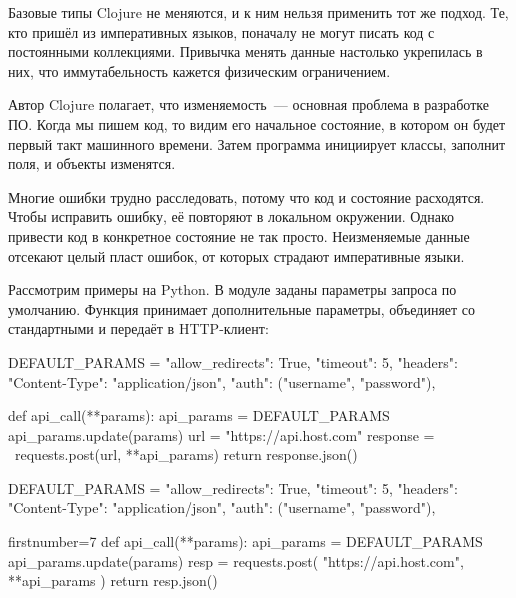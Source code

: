 Базовые типы Clojure не меняются, и к ним нельзя применить тот же подход. Те,
кто пришёл из императивных языков, поначалу не могут писать код с постоянными
коллекциями. Привычка менять данные настолько укрепилась в них, что
иммутабельность кажется физическим ограничением.

Автор Clojure полагает, что изменяемость~--- основная проблема в разработке
ПО. Когда мы пишем код, то видим его начальное состояние, в котором он будет
первый такт машинного времени. Затем программа инициирует классы, заполнит поля,
и объекты изменятся.

Многие ошибки трудно расследовать, потому что код и состояние расходятся. Чтобы
исправить ошибку, её повторяют в локальном окружении. Однако привести код в
конкретное состояние не так просто. Неизменяемые данные отсекают целый пласт
ошибок, от которых страдают императивные языки.


Рассмотрим примеры на Python. В модуле заданы параметры запроса по
умолчанию. Функция  принимает дополнительные параметры,
объединяет со стандартными и передаёт в HTTP-клиент:

\ifnarrow

\begin{python/lines}
DEFAULT_PARAMS = {
    "allow_redirects": True,
    "timeout": 5,
    "headers": {"Content-Type":
                "application/json"},
    "auth": ("username", "password"),
}

def api_call(**params):
    api_params = DEFAULT_PARAMS
    api_params.update(params)
    url = "https://api.host.com"
    response = \
      requests.post(url, **api_params)
    return response.json()
\end{python/lines}

\else

\begin{python/lines}
DEFAULT_PARAMS = {
    "allow_redirects": True,
    "timeout": 5,
    "headers": {"Content-Type": "application/json"},
    "auth": ("username", "password"),
}
\end{python/lines}

\iflarge\pagebreak[4]\fi
\ifafive\pagebreak[4]\fi

\begin{python/lines*}{firstnumber=7}
def api_call(**params):
    api_params = DEFAULT_PARAMS
    api_params.update(params)
    resp = requests.post(
        "https://api.host.com", **api_params
    )
    return resp.json()
\end{python/lines*}

